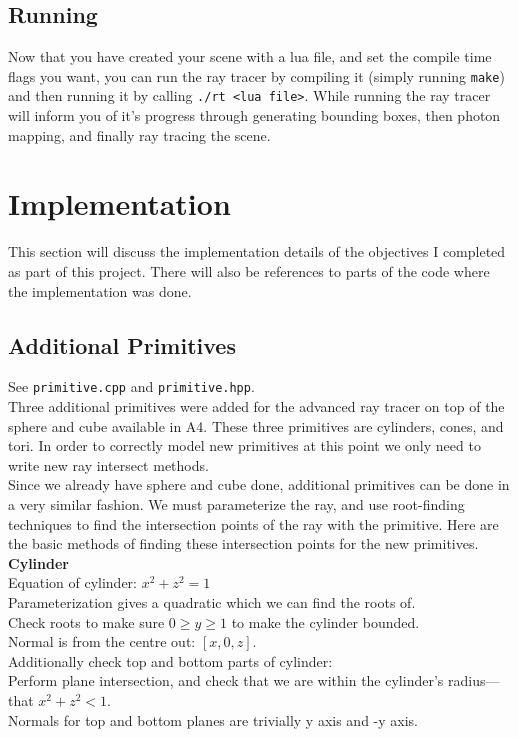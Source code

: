 \documentclass {article}
\begin{document}
\subsection{Running}
Now that you have created your scene with a lua file, and set the compile time
flags you want, you can run the ray tracer by compiling it (simply running
\verb!make!) and then running it by calling \verb!./rt <lua file>!.  While
running the ray tracer will inform you of it's progress through generating
bounding boxes, then photon mapping, and finally ray tracing the scene.

\section{Implementation}

This section will discuss the implementation details of the objectives I
completed as part of this project.  There will also be references to parts of
the code where the implementation was done.

\subsection{Additional Primitives}
See \verb!primitive.cpp! and \verb!primitive.hpp!.\\

Three additional primitives were added for the advanced ray tracer on top of the
sphere and cube available in A4.  These three primitives are cylinders, cones,
and tori.  In order to correctly model new primitives at this point we only need
to write new ray intersect methods.\\

Since we already have sphere and cube done, additional primitives can be done in
a very similar fashion.  We must parameterize the ray, and use root-finding
techniques to find the intersection points of the ray with the primitive.  Here
are the basic methods of finding these intersection points for the new
primitives.\\

\textbf{Cylinder}\\
Equation of cylinder: $x^2 + z^2 = 1$\\
Parameterization gives a quadratic which we can find the roots of.\\
Check roots to make sure $0 \ge y \ge 1$ to make the cylinder bounded.\\
Normal is from the centre out: $[x, 0, z]$.\\
Additionally check top and bottom parts of cylinder:\\
Perform plane intersection, and check that we are within the cylinder's
radius---that $x^2 + z^2 < 1$.\\
Normals for top and bottom planes are trivially y axis and -y axis.\\
\end{document}
